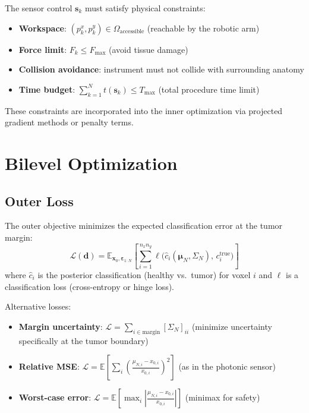\documentclass[11pt,a4paper]{article}
\theoremstyle{definition}
\begin{document}
The sensor control $\bm{s}_k$ must satisfy physical constraints:
\begin{itemize}[nosep]
  \item \textbf{Workspace}: $(p_k^x, p_k^y) \in \Omega_{\text{accessible}}$ (reachable by the robotic arm)
  \item \textbf{Force limit}: $F_k \leq F_{\max}$ (avoid tissue damage)
  \item \textbf{Collision avoidance}: instrument must not collide with surrounding anatomy
  \item \textbf{Time budget}: $\sum_{k=1}^N t(\bm{s}_k) \leq T_{\text{max}}$ (total procedure time limit)
\end{itemize}

These constraints are incorporated into the inner optimization via projected gradient methods or penalty terms.

\section{Bilevel Optimization}

\subsection{Outer Loss}

The outer objective minimizes the expected classification error at the tumor margin:
\[
  \mathcal{L}(\bm{d}) = \mathbb{E}_{\bm{x}_0, \bm{\varepsilon}_{1:N}} \left[ \sum_{i=1}^{n_x n_y} \ell\big(\hat{c}_i(\bm{\mu}_N, \Sigma_N), \, c_i^{\text{true}}\big) \right]
\]
where $\hat{c}_i$ is the posterior classification (healthy vs.\ tumor) for voxel $i$ and $\ell$ is a classification loss (cross-entropy or hinge loss).

Alternative losses:
\begin{itemize}[nosep]
  \item \textbf{Margin uncertainty}: $\mathcal{L} = \sum_{i \in \text{margin}} [\Sigma_N]_{ii}$ (minimize uncertainty specifically at the tumor boundary)
  \item \textbf{Relative MSE}: $\mathcal{L} = \mathbb{E}\left[\sum_i \left(\frac{\mu_{N,i} - x_{0,i}}{x_{0,i}}\right)^2\right]$ (as in the photonic sensor)
  \item \textbf{Worst-case error}: $\mathcal{L} = \mathbb{E}\left[\max_i \left|\frac{\mu_{N,i} - x_{0,i}}{x_{0,i}}\right|\right]$ (minimax for safety)
\end{itemize}
\end{document}
